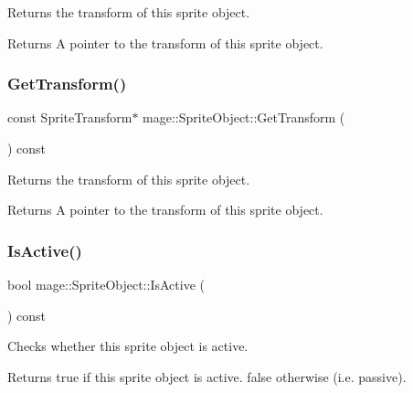 Returns the transform of this sprite object.

\begin{DoxyReturn}{Returns}
A pointer to the transform of this sprite object. 
\end{DoxyReturn}
\hypertarget{classmage_1_1_sprite_object_a73733c89ee3c47d0e8b8bb81a06bc48c}{}\label{classmage_1_1_sprite_object_a73733c89ee3c47d0e8b8bb81a06bc48c} 
\subsubsection{\texorpdfstring{Get\+Transform()}{GetTransform()}\hspace{0.1cm}{\footnotesize\ttfamily [2/2]}}
{\footnotesize\ttfamily const Sprite\+Transform$\ast$ mage\+::\+Sprite\+Object\+::\+Get\+Transform (\begin{DoxyParamCaption}{ }\end{DoxyParamCaption}) const}

Returns the transform of this sprite object.

\begin{DoxyReturn}{Returns}
A pointer to the transform of this sprite object. 
\end{DoxyReturn}
\hypertarget{classmage_1_1_sprite_object_ac6eb3126b6caebc416ec2a112a907b55}{}\label{classmage_1_1_sprite_object_ac6eb3126b6caebc416ec2a112a907b55} 
\subsubsection{\texorpdfstring{Is\+Active()}{IsActive()}}
{\footnotesize\ttfamily bool mage\+::\+Sprite\+Object\+::\+Is\+Active (\begin{DoxyParamCaption}{ }\end{DoxyParamCaption}) const}

Checks whether this sprite object is active.

\begin{DoxyReturn}{Returns}
{\ttfamily true} if this sprite object is active. {\ttfamily false} otherwise (i.\+e. passive). 
\end{DoxyReturn}
\hypertarget{classmage_1_1_sprite_object_ae410ef3f14a7b621e28c066a23575fd0}{}\label{classmage_1_1_sprite_object_ae410ef3f14a7b621e28c066a23575fd0} 
